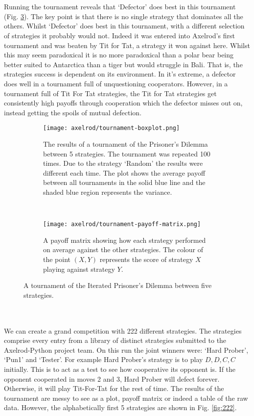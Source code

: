 \label{mmd}
\\
\\
Running the tournament reveals that `Defector' does best in this tournament (Fig. \ref{fig:iterated-p-d-tournament}). The key point is that there is no single strategy that dominates all the others. Whilst `Defector' does best in this tournament, with a different selection of strategies it probably would not. Indeed it was entered into Axelrod's first tournament and was beaten by Tit for Tat, a strategy it won against here. Whilst this may seem paradoxical it is no more paradoxical than a polar bear being better suited to Antarctica than a tiger but would struggle in Bali. That is, the strategies success is dependent on its environment. In it's extreme, a defector does well in a tournament full of unquestioning cooperators. However, in a tournament full of Tit For Tat strategies, the Tit for Tat strategies get consistently high payoffs through cooperation which the defector misses out on, instead getting the spoils of mutual defection.\label{mmd}
\begin{figure}
	\centering
	\begin{subfigure}{\textwidth}
		\centering
		\texttt{[image: axelrod/tournament-boxplot.png]}
		\caption{The results of a tournament of the Prisoner's Dilemma between 5 strategies. The tournament was repeated 100 times. Due to the strategy `Random' the results were different each time. The plot shows the average payoff between all tournaments in the solid blue line and the shaded blue region represents the variance.
		\label{mmd}
		}
		\label{}
	\end{subfigure}%
\\
	\begin{subfigure}{\textwidth}
		\centering
		\texttt{[image: axelrod/tournament-payoff-matrix.png]}
		\caption{A payoff matrix showing how each strategy performed on average against the other strategies. The colour of the point $(X,Y)$ represents the score of strategy $X$ playing against strategy $Y$.}
		\label{}
	\end{subfigure}
	\caption{A tournament of the Iterated Prisoner's Dilemma between five strategies.}
	\label{fig:iterated-p-d-tournament}
\end{figure}\\
\\
We can create a grand competition with 222 different strategies. The strategies comprise every entry from a library of distinct strategies submitted to the Axelrod-Python project team\cite{axelrod-github}.\label{mmd} On this run the joint winners were: `Hard Prober', `Pun1' and `Tester'. For example Hard Prober's strategy is to play $D,D,C,C$ initially. This is to act as a test to see how cooperative its opponent is. If the opponent cooperated in moves 2 and 3, Hard Prober will defect forever. Otherwise, it will play Tit-For-Tat for the rest of time. The results of the tournament are messy to see as a plot, payoff matrix or indeed a table of the raw data. However, the alphabetically first 5 strategies are shown in Fig. \ref{fig:222}.
